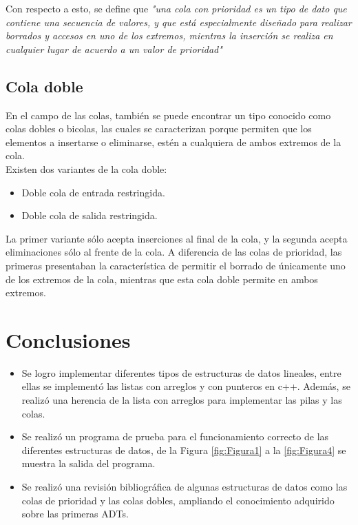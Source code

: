 \documentclass[11pt]{article}
\begin{document}
Con respecto a esto, se define que \textit{"una cola con prioridad es un tipo de dato que contiene una secuencia de valores, y que está especialmente diseñado para realizar borrados y accesos en uno de los extremos, mientras la inserción se realiza en cualquier lugar de acuerdo a un valor de prioridad"} \cite{Est} 

\subsection{Cola doble}

En el campo de las colas, también se puede encontrar un tipo conocido como colas dobles o bicolas, las cuales se caracterizan porque permiten que los elementos a insertarse o eliminarse, estén a cualquiera de ambos extremos de la cola.
\\Existen dos variantes de la cola doble: 
\begin{itemize}
\item Doble cola de entrada restringida. 
\item Doble cola de salida restringida. 
\end{itemize}
\cite{Dobles} 

La primer variante sólo acepta inserciones al final de la cola, y la segunda acepta eliminaciones sólo al frente de la cola. A diferencia de las colas de prioridad, las primeras presentaban la característica de permitir el borrado de únicamente uno de los extremos de la cola, mientras que esta cola doble permite en ambos extremos. 

\section{Conclusiones}

\begin{itemize}
\item Se logro implementar diferentes tipos de estructuras de datos lineales, entre ellas se implementó las listas con arreglos y con punteros en c++. Además, se realizó una herencia de la lista con arreglos para implementar las pilas y las colas.

\item Se realizó un programa de prueba para el funcionamiento correcto de las diferentes estructuras de datos, de la Figura \ref{fig:Figura1} a la \ref{fig:Figura4} se muestra la salida del programa.

\item Se realizó una revisión bibliográfica de algunas estructuras de datos como las colas de prioridad y las colas dobles, ampliando el conocimiento adquirido sobre las primeras ADTs.
\end{itemize}
\end{document}
